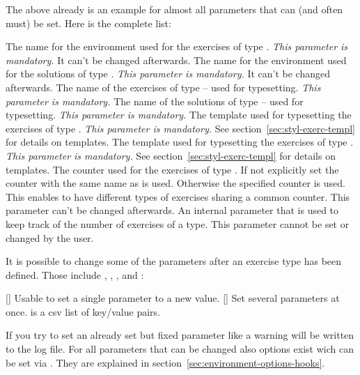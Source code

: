 \documentclass{xsim-manual}
\begin{document}
The above already is an example for almost all parameters that can (and often
must) be set.  Here is the complete list:
\begin{parameters}
    The name for the environment used for the exercises of type .
    \emph{This parameter is mandatory.} It can't be changed afterwards.
    The name for the environment used for the solutions of type .
    \emph{This parameter is mandatory.} It can't be changed afterwards.
    The name of the exercises of type  -- used for typesetting.
    \emph{This parameter is mandatory.}
    The name of the solutions of type  -- used for typesetting.
    \emph{This parameter is mandatory.}
    The template used for typesetting the exercises of type .
    \emph{This parameter is mandatory.} See
    section~\vref{sec:styl-exerc-templ} for details on templates.
    The template used for typesetting the exercises of type .
    \emph{This parameter is mandatory.} See
    section~\vref{sec:styl-exerc-templ} for details on templates.
    The counter used for the exercises of type .  If not explicitly
    set the counter with the same name as  is used.
    Otherwise the specified counter is used.  This enables to have different
    types of exercises sharing a common counter.  This parameter can't be
    changed afterwards.
    An internal parameter that is used to keep track of the number of
    exercises of a type.  This parameter cannot be set or changed by the
    user.
\end{parameters}

It is possible to change some of the parameters after an exercise type has
been defined.  Those include ,
, , and
:
\begin{commands}
  []
    Usable to set a single parameter to a new value.
  []
    Set several parameters at once.  is a csv list of
    key/value pairs.
\end{commands}
If you try to set an already set but fixed parameter like
 a warning will be written to the log file.  For all
parameters that can be changed also options exist wich can be set via
.  They are explained in
section~\vref{sec:environment-options-hooks}.
\end{document}
